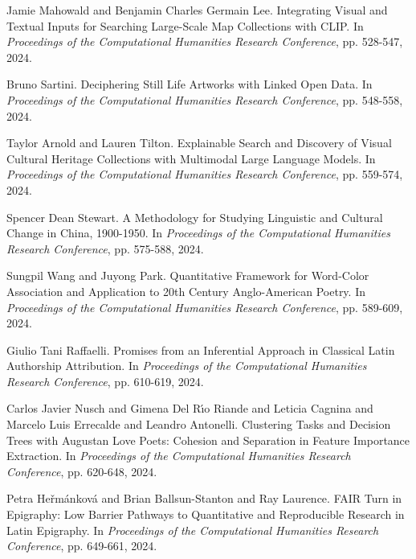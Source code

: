 \begin{thebibliography}{99}
 Jamie Mahowald and Benjamin Charles Germain Lee. {I}ntegrating {V}isual and {T}extual {I}nputs for {S}earching {L}arge-{S}cale {M}ap {C}ollections with {C}LI{P}. In \textit{Proceedings of the Computational Humanities Research Conference}, pp. 528-547, 2024.

 Bruno Sartini. {D}eciphering {S}till {L}ife {A}rtworks with {L}inked {O}pen {D}ata. In \textit{Proceedings of the Computational Humanities Research Conference}, pp. 548-558, 2024.

 Taylor Arnold and Lauren Tilton. {E}xplainable {S}earch and {D}iscovery of {V}isual {C}ultural {H}eritage {C}ollections with {M}ultimodal {L}arge {L}anguage {M}odels. In \textit{Proceedings of the Computational Humanities Research Conference}, pp. 559-574, 2024.

 Spencer Dean Stewart. {A} Methodology for {S}tudying {L}inguistic and {C}ultural {C}hange in {C}hina, 1900-1950. In \textit{Proceedings of the Computational Humanities Research Conference}, pp. 575-588, 2024.

 Sungpil Wang and Juyong Park. {Q}uantitative {F}ramework for {W}ord-{C}olor {A}ssociation and {A}pplication to 20th {C}entury {A}nglo-{A}merican {P}oetry. In \textit{Proceedings of the Computational Humanities Research Conference}, pp. 589-609, 2024.

 Giulio Tani Raffaelli. {P}romises from an {I}nferential {A}pproach in {C}lassical {L}atin {A}uthorship {A}ttribution. In \textit{Proceedings of the Computational Humanities Research Conference}, pp. 610-619, 2024.

 Carlos Javier Nusch and Gimena Del R{\'\i}o Riande and Leticia Cagnina and Marcelo Luis Errecalde and Leandro Antonelli. {C}lustering {T}asks and {D}ecision {T}rees with {A}ugustan {L}ove {P}oets: {C}ohesion and {S}eparation in {F}eature {I}mportance {E}xtraction. In \textit{Proceedings of the Computational Humanities Research Conference}, pp. 620-648, 2024.

 Petra He{\v r}m{\'a}nkov{\'a} and Brian Ballsun-Stanton and Ray Laurence. F{A}IR {T}urn in {E}pigraphy: {L}ow {B}arrier {P}athways to {Q}uantitative and {R}eproducible {R}esearch in {L}atin {E}pigraphy. In \textit{Proceedings of the Computational Humanities Research Conference}, pp. 649-661, 2024.


\end{thebibliography}
